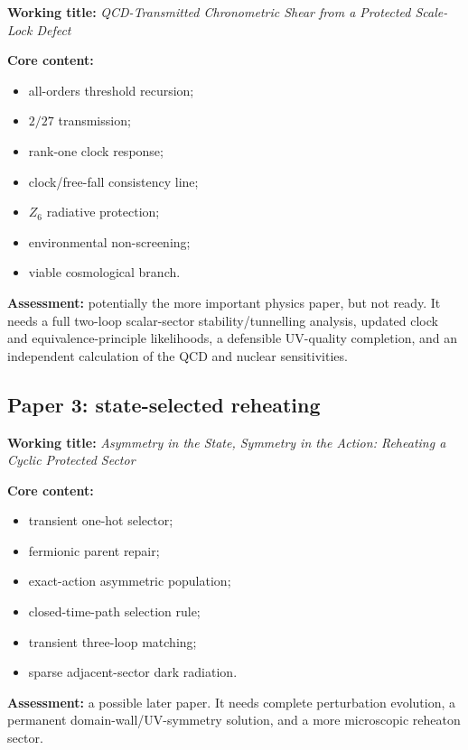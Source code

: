 \documentclass[
  10pt,
]{article}
\providecommand{\tightlist}{%
  \setlength{\itemsep}{0pt}\setlength{\parskip}{0pt}}
\begin{document}
\textbf{Working title:} \emph{QCD-Transmitted Chronometric Shear from a
Protected Scale-Lock Defect}

\textbf{Core content:}

\begin{itemize}
\tightlist
\item
  all-orders threshold recursion;
\item
  \(2/27\) transmission;
\item
  rank-one clock response;
\item
  clock/free-fall consistency line;
\item
  \(Z_6\) radiative protection;
\item
  environmental non-screening;
\item
  viable cosmological branch.
\end{itemize}

\textbf{Assessment:} potentially the more important physics paper, but
not ready. It needs a full two-loop scalar-sector stability/tunnelling
analysis, updated clock and equivalence-principle likelihoods, a
defensible UV-quality completion, and an independent calculation of the
QCD and nuclear sensitivities.

\subsection{Paper 3: state-selected
reheating}\label{paper-3-state-selected-reheating}

\textbf{Working title:} \emph{Asymmetry in the State, Symmetry in the
Action: Reheating a Cyclic Protected Sector}

\textbf{Core content:}

\begin{itemize}
\tightlist
\item
  transient one-hot selector;
\item
  fermionic parent repair;
\item
  exact-action asymmetric population;
\item
  closed-time-path selection rule;
\item
  transient three-loop matching;
\item
  sparse adjacent-sector dark radiation.
\end{itemize}

\textbf{Assessment:} a possible later paper. It needs complete
perturbation evolution, a permanent domain-wall/UV-symmetry solution,
and a more microscopic reheaton sector.
\end{document}
